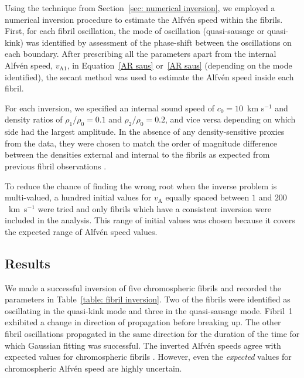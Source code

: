 \documentclass[12pt]{../style-files/ociamthesis}
\begin{document}
Using the technique from Section~\ref{sec: numerical inversion}, we employed a numerical inversion procedure to estimate the Alfv\'{e}n speed within the fibrils. First, for each fibril oscillation, the mode of oscillation (quasi-sausage or quasi-kink) was identified by assessment of the phase-shift between the oscillations on each boundary. After prescribing all the parameters apart from the internal Alfv\'{e}n speed, $v_\mathrm{A1}$, in Equation~\eqref{AR saus} or~\eqref{AR saus} (depending on the mode identified), the secant method was used to estimate the Alfv\'{e}n speed inside each fibril.

For each inversion, we specified an internal sound speed of $c_0 = 10$~km s$^{-1}$ and density ratios of $\rho_1/\rho_0 = 0.1$ and $\rho_2/\rho_0 = 0.2$, and vice versa depending on which side had the largest amplitude. In the absence of any density-sensitive proxies from the data, they were chosen to match the order of magnitude difference between the densities external and internal to the fibrils as expected from previous fibril observations \citep{lee_etal12,mor_etal12}.

To reduce the chance of finding the wrong root when the inverse problem is multi-valued, a hundred initial values for $v_\mathrm{A}$ equally spaced between $1$ and $200$~km~s$^{-1}$ were tried and only fibrils which have a consistent inversion were included in the analysis. This range of initial values was chosen because it covers the expected range of Alfv\'{e}n speed values.


\subsection{Results}\label{sec:sms results}
We made a successful inversion of five chromospheric fibrils and recorded the parameters in Table~\ref{table: fibril inversion}. Two of the fibrils were identified as oscillating in the quasi-kink mode and three in the quasi-sausage mode. Fibril~1 exhibited a change in direction of propagation before breaking up. The other fibril oscillations propagated in the same direction for the duration of the time for which Gaussian fitting was successful. The inverted Alfv\'{e}n speeds agree with expected values for chromospheric fibrils \citep{mor_etal12}. However, even the \textit{expected} values for chromospheric Alfv\'{e}n speed are highly uncertain.
\end{document}
